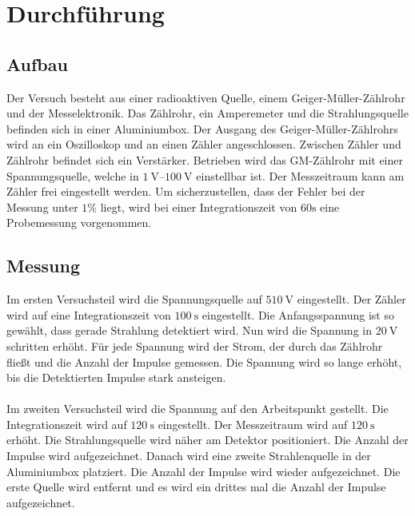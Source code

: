 \section{Durchführung}
\label{sec:Durchführung}

\subsection{Aufbau}

Der Versuch besteht aus einer radioaktiven Quelle, einem Geiger-Müller-Zählrohr und der Messelektronik.
Das Zählrohr, ein Amperemeter und die Strahlungsquelle befinden sich in einer Aluminiumbox.
Der Ausgang des Geiger-Müller-Zählrohrs wird an ein Oszilloskop und an einen Zähler angeschlossen.
Zwischen Zähler und Zählrohr befindet sich ein Verstärker. 
Betrieben wird das GM-Zählrohr mit einer Spannungsquelle, welche in $\SIrange{1}{100}{\volt}$ einstellbar ist.
Der Messzeitraum kann am Zähler frei eingestellt werden.
Um sicherzustellen, dass der Fehler bei der Messung unter $1\%$ liegt, wird bei einer Integrationszeit von $60\si{\second}$ eine Probemessung vorgenommen.

\subsection{Messung}

Im ersten Versuchsteil wird die Spannungsquelle auf $\SI{510}{\volt}$ eingestellt. Der Zähler wird auf eine Integrationszeit von $\SI{100}{\second}$ eingestellt.
Die Anfangsspannung ist so gewählt, dass gerade Strahlung detektiert wird. Nun wird die Spannung in $\SI{20}{\volt}$ schritten erhöht.
Für jede Spannung wird der Strom, der durch das Zählrohr fließt und die Anzahl der Impulse gemessen.
Die Spannung wird so lange erhöht, bis die Detektierten Impulse stark ansteigen.\\
\\
Im zweiten Versuchsteil wird die Spannung auf den Arbeitspunkt gestellt. Die Integrationszeit wird auf $\SI{120}{\second}$ eingestellt. 
Der Messzeitraum wird auf $\SI{120}{\second}$ erhöht. Die Strahlungsquelle wird näher am Detektor positioniert.
Die Anzahl der Impulse wird aufgezeichnet. Danach wird eine zweite Strahlenquelle in der Aluminiumbox platziert.
Die Anzahl der Impulse wird wieder aufgezeichnet. 
Die erste Quelle wird entfernt und es wird ein drittes mal die Anzahl der Impulse aufgezeichnet.\\
\newpage